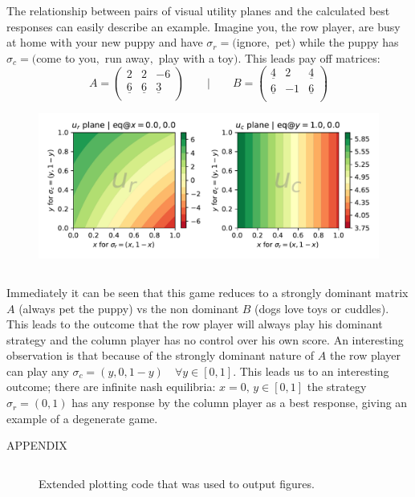 \documentclass[9pt]{report}
\begin{document}
    The relationship between pairs of visual utility planes and the calculated best responses can easily describe an example. Imagine you, the row player, are busy at home with your new puppy and have $\sigma_r=($ignore$,$ pet$)$ while the puppy has $\sigma_c=($come to you$,$ run away$,$ play with a toy$)$. This leads pay off matrices:
    \begingroup\makeatletter\def\f@size{8}\check@mathfonts
    $$
    A = \begin{pmatrix} 2 & 2 & -6 \\ \underline6 & \underline6 & \underline3 \\ \end{pmatrix}
    \qquad \vert \qquad
    B = \begin{pmatrix} \underline4 & 2 & \underline4 \\ \underline6 & -1 & \underline6 \\ \end{pmatrix}
    $$
    \endgroup
    \begin{figure}[!b]
        \centering
        \begin{minipage}{0.48\textwidth}
            \centering
            \includegraphics[width=1.0\textwidth, center]{./img/f3.pdf}
        \end{minipage}\hfill
        \begin{minipage}{0.48\textwidth}
            \inputminted[fontsize=\small]{python}{./code/nashpy-ex.py} 
        \end{minipage}
    \end{figure}
    Immediately it can be seen that this game reduces to a strongly dominant matrix $A$ (always pet the puppy) vs the non dominant $B$ (dogs love toys or cuddles). This leads to the outcome that the row player will always play his dominant strategy and the column player has no control over his own score. An interesting observation is that because of the strongly dominant nature of $A$ the row player can play any $\sigma_c=(y,0,1-y)\quad \forall y \in [0,1]$. This leads us to an interesting outcome; there are infinite nash equilibria: $x=0,\, y\in[0,1]$ the strategy $\sigma_r=(0,1)$ has any response by the column player as a best response, giving an example of a degenerate game.
    
        \newpage    
        APPENDIX
        \begin{figure}[ht]
            \inputminted[fontsize=\tiny]{python}{./code/plottingCode.py}
            \caption{Extended plotting code that was used to output figures.}
        \end{figure}
    
    
\end{document}
